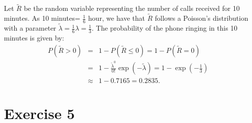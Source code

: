 \documentclass[12pt,thmsa]{article}\usepackage[]{graphicx}\usepackage[]{color}
\begin{document}
\begin{enumerate}
Let $ \tilde{R} $ be the random variable representing the number of calls received for 10 minutes.
As 10 minutes= $\frac{1}{6}$ hour, we have that $\tilde{R}$ follows a Poisson's distribution with a parameter $\tilde{\lambda}=\frac{1}{6}\lambda=\frac{1}{3}$.
The probability of the phone ringing in this 10 minutes is given by:
\begin{eqnarray*}
P(\tilde{R}>0) & = & \left. 1- P(\tilde{R}\leq 0) = 1- P(\tilde{R} = 0)  \right. \nonumber \\
& = & \left. 1- \frac{\tilde{\lambda}^{0}}{0!}\exp(-\tilde{\lambda}) = 1 -\exp\left(-\frac{1}{3}\right)\right. \nonumber \\
& \approx & \left. 1-0.7165 = 0.2835. \right. \nonumber
\end{eqnarray*}

\end{enumerate}





\section*{Exercise 5}
\end{document}
